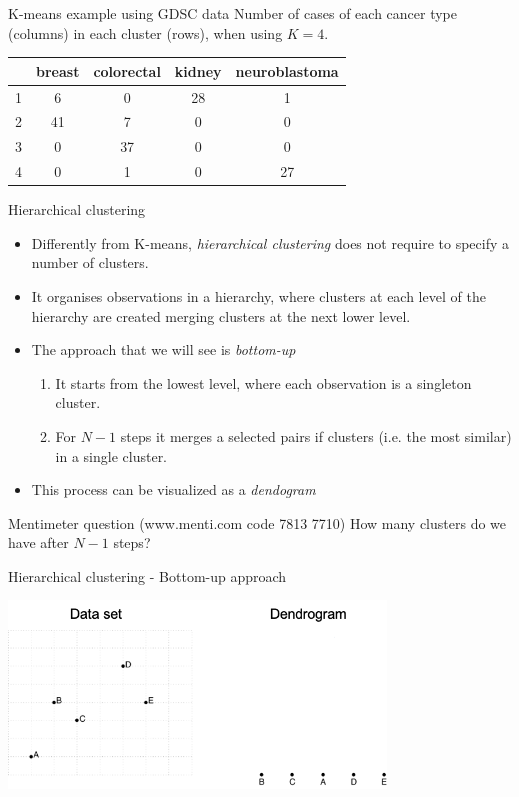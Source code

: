 \documentclass[notes]{beamer}          %
\begin{document}
\begin{frame}{K-means example using GDSC data}
Number of cases of each cancer type (columns) in each cluster (rows), when using $K=4$.
\begin{center}
\begin{tabular}{ c | | c | c | c | c }
& breast & colorectal & kidney & neuroblastoma \\
\hline \hline
1 & 6 & 0 & 28 & 1 \\ 
2 & 41 & 7 & 0 & 0\\
3 & 0 & 37 & 0 & 0\\
4 & 0 & 1 & 0 & 27\\
\end{tabular}
\end{center}
\end{frame}



\begin{frame}{Hierarchical clustering}
\begin{itemize}
\item Differently from K-means, \textit{hierarchical clustering} does not require to specify a number of clusters.
\item It organises observations in a hierarchy, where clusters at each level of the hierarchy are created merging clusters at the next lower level.
\item The approach that we will see is \textit{bottom-up}
\begin{enumerate}
 \item It starts from the lowest level, where each observation is a singleton cluster.
 \item For $N-1$ steps it merges a selected pairs if clusters (i.e. the most similar) in a single cluster.
\end{enumerate}
\item This process can be visualized as a \textit{dendogram}
\end{itemize}
\end{frame}

\begin{frame}{Mentimeter question (www.menti.com code 7813 7710)}
How many clusters do we have after $N-1$ steps?
\end{frame}

\begin{frame}{Hierarchical clustering - Bottom-up approach }
\begin{center}
\includegraphics[height=5cm]{../figures/week_6/HierarchicalClustering_1.png}  
\end{center}
\end{frame}
\end{document}
